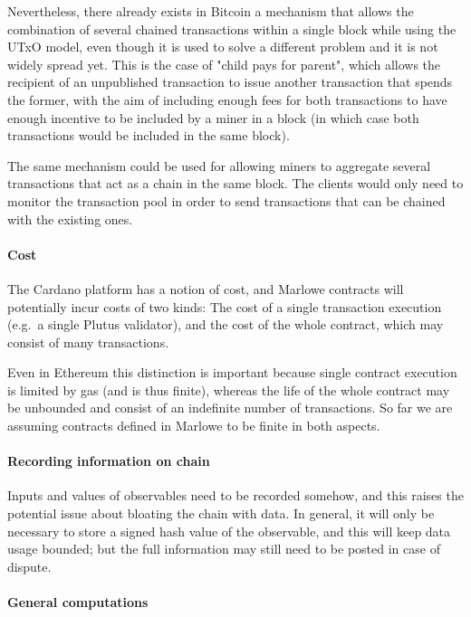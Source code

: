 \documentclass[runningheads]{llncs}
\begin{document}
Nevertheless, there already exists in Bitcoin a mechanism that allows the combination of several chained transactions 
within a single block while using the UTxO model, even though it is used to solve a different problem and it is not 
widely spread yet. This is the case of "child pays for parent", which allows the recipient of an unpublished transaction 
to issue another transaction that spends the former, with the aim of including enough fees for both transactions to have 
enough incentive to be included by a miner in a block (in which case both transactions would be included in the same 
block).

The same mechanism could be used for allowing miners to aggregate several transactions that act as a chain in the same 
block. The clients would only need to monitor the transaction pool in order to send transactions that can be chained 
with the existing ones.

\paragraph{Cost}

The Cardano platform has a notion of cost, and Marlowe contracts will potentially incur costs of two kinds: The cost of 
a single transaction execution (e.g.\ a single Plutus validator), and the cost of the whole contract, which may consist 
of many transactions.

Even in Ethereum this distinction is important because single contract execution is limited by gas (and is thus 
finite), whereas the life of the whole contract may be unbounded and consist of an indefinite number of transactions.  
So far we are assuming contracts defined in Marlowe to be finite in both aspects. 

\paragraph{Recording information on chain}

Inputs and values of observables need to be recorded somehow, and this raises the potential issue about bloating 
the chain with data. In general, it will only be necessary to store a signed hash value of the observable, and this will 
keep data usage bounded; but the full information may still need to be posted in case of dispute.


\paragraph{General computations}
\end{document}
